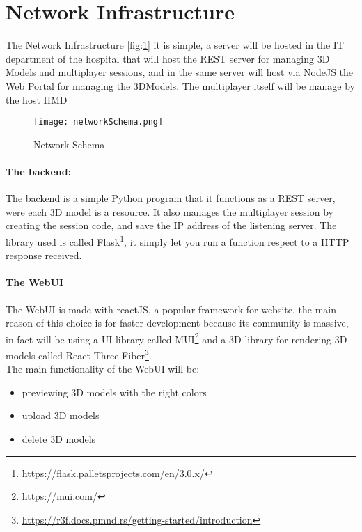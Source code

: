 \section{Network Infrastructure}
\noindent
The Network Infrastructure [fig:\ref{fig:NetworkSchema}] it is simple, a server will be hosted in the IT department of the hospital that will host the \ac{REST} server for managing 3D Models and multiplayer sessions,
and in the same server will host via NodeJS the Web Portal for managing the 3DModels.
The multiplayer itself will be manage by the host \ac{HMD}

\begin{figure}[h]
  \centering
  \texttt{[image: networkSchema.png]}
  \caption{Network Schema}
  \label{fig:NetworkSchema}
\end{figure}


\paragraph{The backend:}
The backend is a simple Python program that it functions as a \ac{REST} server, were each 3D model is a resource.
It also manages the multiplayer session by creating the session code, and save the \ac{IP} address of the listening server.
The library used is called Flask\footnote{\url{https://flask.palletsprojects.com/en/3.0.x/}}, it simply let you run a function respect to a \ac{HTTP} response received.

\paragraph{The WebUI}
The WebUI is made with reactJS, a popular framework for website, the main reason of this choice is for faster development because its community is massive, in fact will be using a UI library called MUI\footnote{\url{https://mui.com/}}
and a 3D library for rendering 3D models called React Three Fiber\footnote{\url{https://r3f.docs.pmnd.rs/getting-started/introduction}}.\\
The main functionality of the WebUI will be:
\begin{itemize}
  \item previewing 3D models with the right colors 
  \item upload 3D models
  \item delete 3D models
\end{itemize}


